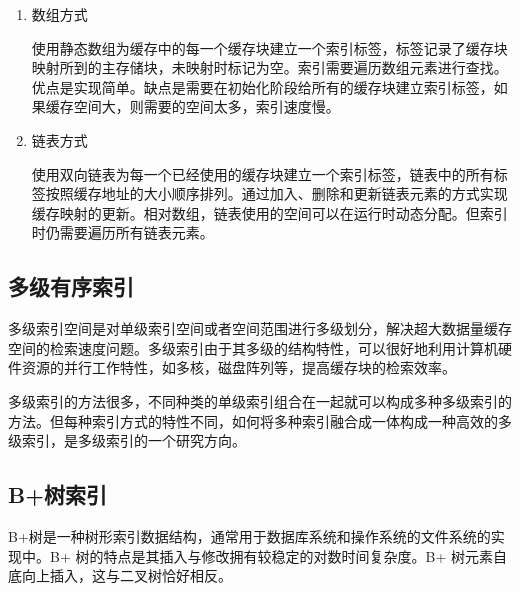 \begin{enumerate}
\item 数组方式

使用静态数组为缓存中的每一个缓存块建立一个索引标签，标签记录了缓存块映射所到的主存储块，未映射时标记为空。索引需要遍历数组元素进行查找。优点是实现简单。缺点是需要在初始化阶段给所有的缓存块建立索引标签，如果缓存空间大，则需要的空间太多，索引速度慢。
\item 链表方式

使用双向链表为每一个已经使用的缓存块建立一个索引标签，链表中的所有标签按照缓存地址的大小顺序排列。通过加入、删除和更新链表元素的方式实现缓存映射的更新。相对数组，链表使用的空间可以在运行时动态分配。但索引时仍需要遍历所有链表元素。
\end{enumerate}

\subsection{多级有序索引}

多级索引空间是对单级索引空间或者空间范围进行多级划分，解决超大数据量缓存空间的检索速度问题。多级索引由于其多级的结构特性，可以很好地利用计算机硬件资源的并行工作特性，如多核，磁盘阵列等，提高缓存块的检索效率。

多级索引的方法很多，不同种类的单级索引组合在一起就可以构成多种多级索引的方法。但每种索引方式的特性不同，如何将多种索引融合成一体构成一种高效的多级索引，是多级索引的一个研究方向。

\subsection{B+树索引}
B+树\cite{bplustree2012}是一种树形索引数据结构，通常用于数据库系统和操作系统的文件系统的实现中。B+ 树的特点是其插入与修改拥有较稳定的对数时间复杂度。B+ 树元素自底向上插入，这与二叉树恰好相反。

